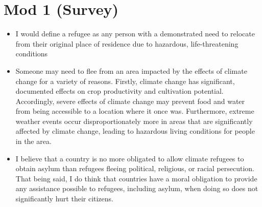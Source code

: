 \documentclass[11pt]{article}
\begin{document}
\section{Mod 1 (Survey)}
\label{sec:org3eddb61}
\begin{itemize}
\item I would define a refugee as any person with a demonstrated need to relocate from their original place of residence due to hazardous, life-threatening conditions
\item Someone may need to flee from an area impacted by the effects of climate change for a variety of reasons. Firstly, climate change has significant, documented effects on crop productivity and cultivation potential. Accordingly, severe effects of climate change may prevent food and water from being accessible to a location where it once was. Furthermore, extreme weather events occur disproportionately more in areas that are significantly affected by climate change, leading to hazardous living conditions for people in the area.
\item I believe that a country is no more obligated to allow climate refugees to obtain asylum than refugees fleeing political, religious, or racial persecution. That being said, I do think that countries have a moral obligation to provide any assistance possible to refugees, including asylum, when doing so does not significantly hurt their citizens.
\end{itemize}
\end{document}
